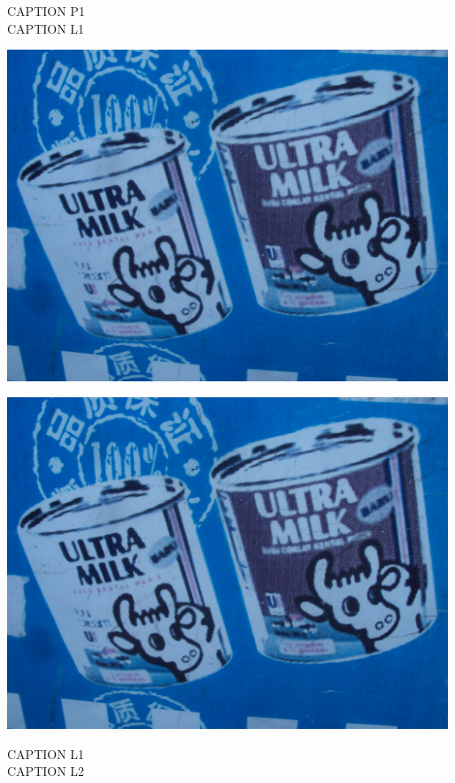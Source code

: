 \documentclass[10pt,letterpaper]{article}
\begin{document}
CAPTION P1\\
CAPTION L1\\
\pagebreak

\includegraphics[width=5.19in]{landscape.jpg}

\vspace{0.25in}
\includegraphics[width=5.19in]{landscape.jpg}

CAPTION L1\\
CAPTION L2\\
\pagebreak
\end{document}
